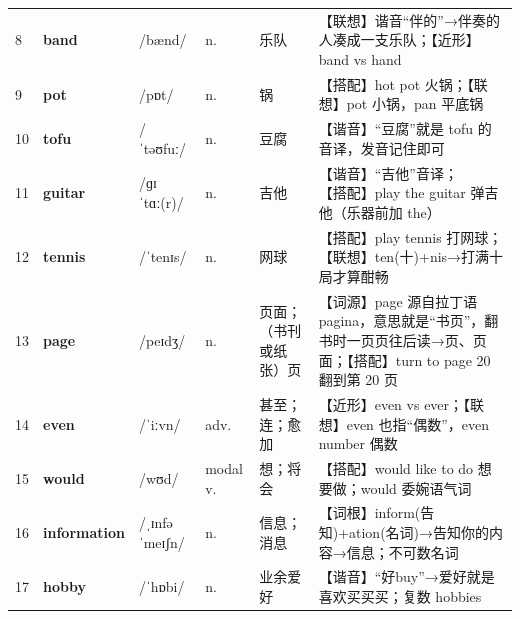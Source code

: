 \documentclass[UTF8,a4paper,11pt,oneside]{ctexbook}
\newcommand{\cellword}[1]{{\bfseries\textcolor{wordcol}{#1}}}
\newcommand{\cellipa}[1]{{\footnotesize\textcolor{ipacol}{#1}}}
\newcommand{\cellpos}[1]{\textcolor{poscol}{#1}}
\newcommand{\cellno}[1]{\textcolor{volcolor!75!black}{#1}}
\begin{document}
{\begin{longtable}{@{}C{0.045\textwidth}L{0.155\textwidth}L{0.175\textwidth}C{0.070\textwidth}L{0.180\textwidth}L{0.282\textwidth}@{}}
\cellno{8} & \cellword{band} & \cellipa{/bænd/} & \cellpos{n.} & 乐队 & \textcolor{tagAssoc}{【联想】}谐音“伴的”→\allowbreak{}伴奏的人凑成一支乐队；\textcolor{tagNear}{【近形】}band vs hand \\
 \cellno{9} & \cellword{pot} & \cellipa{/pɒt/} & \cellpos{n.} & 锅 & \textcolor{tagColloc}{【搭配】}hot pot 火锅；\textcolor{tagAssoc}{【联想】}pot 小锅，pan 平底锅 \\
\cellno{10} & \cellword{tofu} & \cellipa{/ˈtəʊfuː/} & \cellpos{n.} & 豆腐 & \textcolor{tagSound}{【谐音】}“豆腐”就是 tofu 的音译，发音记住即可 \\
 \cellno{11} & \cellword{guitar} & \cellipa{/ɡɪˈtɑː(r)/} & \cellpos{n.} & 吉他 & \textcolor{tagSound}{【谐音】}“吉他”音译；\textcolor{tagColloc}{【搭配】}play the guitar 弹吉他（乐器前加 the） \\
\cellno{12} & \cellword{tennis} & \cellipa{/ˈtenɪs/} & \cellpos{n.} & 网球 & \textcolor{tagColloc}{【搭配】}play tennis 打网球；\textcolor{tagAssoc}{【联想】}ten(十)+nis→\allowbreak{}打满十局才算酣畅 \\
 \cellno{13} & \cellword{page} & \cellipa{/peɪdʒ/} & \cellpos{n.} & 页面；（书刊或纸张）页 & \textcolor{tagEtym}{【词源】}page 源自拉丁语 pagina，意思就是“书页”，翻书时一页页往后读→\allowbreak{}页、页面；\textcolor{tagColloc}{【搭配】}turn to page 20 翻到第 20 页 \\
\cellno{14} & \cellword{even} & \cellipa{/ˈiːvn/} & \cellpos{adv.} & 甚至；连；愈加 & \textcolor{tagNear}{【近形】}even vs ever；\textcolor{tagAssoc}{【联想】}even 也指“偶数”，even number 偶数 \\
 \cellno{15} & \cellword{would} & \cellipa{/wʊd/} & \cellpos{modal v.} & 想；将会 & \textcolor{tagColloc}{【搭配】}would like to do 想要做；would 委婉语气词 \\
\cellno{16} & \cellword{information} & \cellipa{/ˌɪnfəˈmeɪʃn/} & \cellpos{n.} & 信息；消息 & \textcolor{tagRoot}{【词根】}inform(告知)+ation(名词)→\allowbreak{}告知你的内容→\allowbreak{}信息；不可数名词 \\
 \cellno{17} & \cellword{hobby} & \cellipa{/ˈhɒbi/} & \cellpos{n.} & 业余爱好 & \textcolor{tagSound}{【谐音】}“好buy”→\allowbreak{}爱好就是喜欢买买买；复数 hobbies \\
\end{longtable}
}

\end{document}
